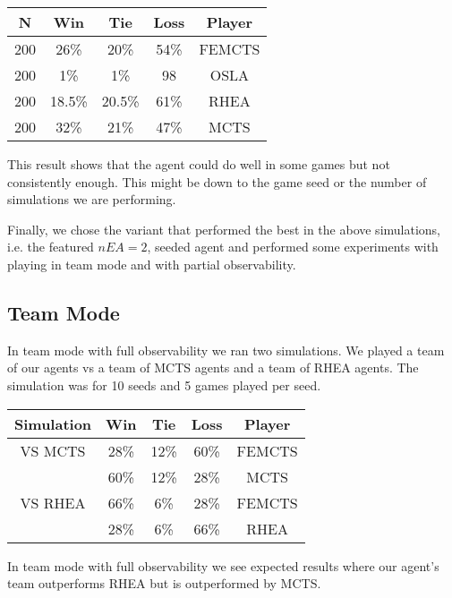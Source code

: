 \documentclass{llncs}
\begin{document}
\vspace{3mm}
\noindent
\begin{center}
\begin{tabular}{ |c|c|c|c|c| } 
 \hline
  N	    & Win &	Tie & Loss & Player \\ 
  \hline
  200	&26\%	&20\%	&54\% & FEMCTS \\
  200  &1\% &	1\%	&98 & OSLA\\
  200  &18.5\% &	20.5\%	&61\% & RHEA\\
  200	&32\%	& 21\%	&47\% & MCTS\\
 \hline
\end{tabular}
\label{sophisticatedtable}
\end{center} 

\vspace{3mm}

\noindent
This result shows that the agent could do well in some games but not consistently enough. This might be down to the game seed or the number of simulations we are performing.
\vspace{5mm}

\noindent
Finally, we chose the variant that performed the best in the above simulations, i.e. the featured $nEA = 2$, seeded agent and performed some experiments with playing in team mode and with partial observability. 

\subsection{Team Mode}

In team mode with full observability we ran two simulations. We played a team of our agents vs a team of MCTS agents and a team of RHEA agents. The simulation was for 10 seeds and 5 games played per seed. 

\vspace{3mm}
\noindent
\begin{center}
\begin{tabular}{ |c|c|c|c|c| } 
 \hline
  Simulation & Win &	Tie & Loss & Player \\ 
  \hline
  VS MCTS & 28\%	&12\%	&60\% & FEMCTS \\
    & 60\%	& 12\%	&28\% & MCTS\\
 \hline
  VS RHEA & 66\%	&6\%	&28\% & FEMCTS \\
    & 28\%	& 6\%	&66\% & RHEA\\
 \hline
\end{tabular}
\label{sophisticatedtable}
\end{center} 
\noindent
In team mode with full observability we see expected results where our agent's team outperforms RHEA but is outperformed by MCTS.
\end{document}
